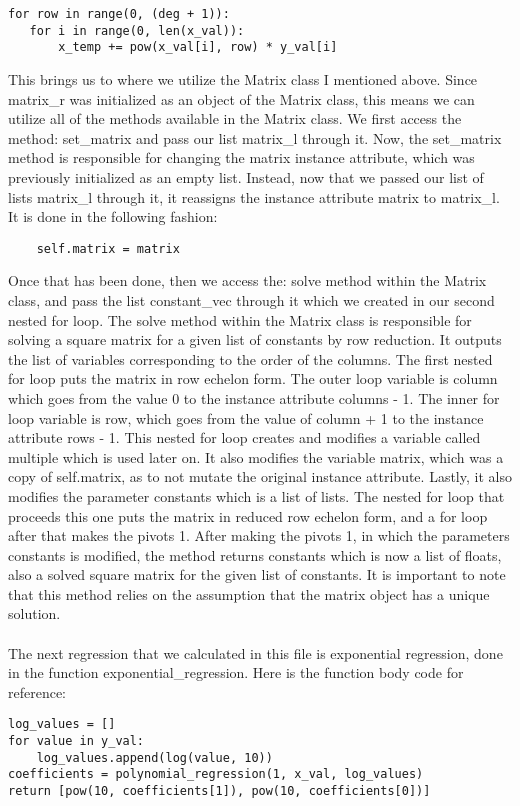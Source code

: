 \documentclass[fontsize=11pt]{article}
\begin{document}
\begin{verbatim}
for row in range(0, (deg + 1)):
   for i in range(0, len(x_val)):
       x_temp += pow(x_val[i], row) * y_val[i]

\end{verbatim}

This brings us to where we utilize the Matrix class I mentioned above. Since matrix\_r was initialized as an object of the Matrix class, this means we can utilize all of the methods available in the Matrix class. We first access the method: set\_matrix and pass our list matrix\_l through it. Now, the set\_matrix method is responsible for changing the matrix instance attribute, which was previously initialized as an empty list. Instead, now that we passed our list of lists matrix\_l through it, it reassigns the instance attribute matrix to matrix\_l. It is done in the following fashion:
\begin{verbatim}
    self.matrix = matrix
\end{verbatim}
Once that has been done, then we access the: solve method within the Matrix class, and pass the list constant\_vec through it which we created in our second nested for loop. The solve method within the Matrix class is responsible for solving a square matrix for a given list of constants by row reduction. It outputs the list of variables corresponding to the order of the columns. The first nested for loop puts the matrix in row echelon form. The outer loop variable is column which goes from the value 0 to the instance attribute columns - 1. The inner for loop variable is row, which goes from the value of column + 1 to the instance attribute rows - 1. This nested for loop creates and modifies a variable called multiple which is used later on. It also modifies the variable matrix, which was a copy of self.matrix, as to not mutate the original instance attribute. Lastly, it also modifies the parameter constants which is a list of lists. The nested for loop that proceeds this one puts the matrix in reduced row echelon form, and a for loop after that makes the pivots 1. After making the pivots 1, in which the parameters constants is modified, the method returns constants which is now a list of floats, also a solved square matrix for the given list of constants. It is important to note that this method relies on the assumption that the matrix object has a unique solution.\\

\\The next regression that we calculated in this file is exponential regression, done in the function exponential\_regression. Here is the function body code for reference:
\begin{verbatim}
log_values = []
for value in y_val:
    log_values.append(log(value, 10))
coefficients = polynomial_regression(1, x_val, log_values)
return [pow(10, coefficients[1]), pow(10, coefficients[0])]
\end{verbatim}
\end{document}
